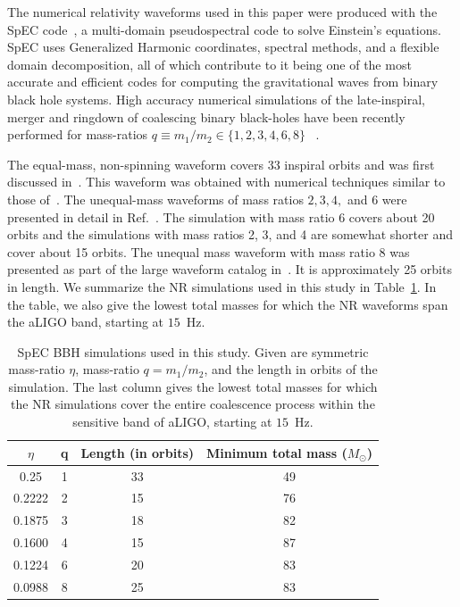 \documentclass[aps,
prd,
twocolumn,
superscriptaddress,
lengthcheck,showpacs,letterpaper,nofootinbib,
floatfix]{revtex4-1}
\begin{document}
The numerical relativity waveforms used in this paper were produced
with the SpEC code~\cite{spec}, a multi-domain pseudospectral code to solve
Einstein's equations. SpEC uses Generalized Harmonic coordinates,
spectral methods, and a flexible domain decomposition, all of which
contribute to it being one of the most accurate and efficient codes
for computing the gravitational waves from binary black hole
systems. High accuracy numerical simulations of the late-inspiral,
merger and ringdown  of coalescing binary black-holes have been
recently performed for mass-ratios $q\equiv m_1/m_2\in\{1,2,3,4,6,8\}$
~\cite{Buchman:2012dw,Scheel:2008rj,NRPNComparisonBoyleetal,Mroue:2012kv}.

The equal-mass,
non-spinning waveform covers 33 inspiral orbits and was first discussed
in~\cite{MacDonald:2012mp,Mroue:2012kv}. 
This waveform was obtained with numerical techniques similar to those 
of~\cite{Buchman:2012dw}. The unequal-mass waveforms of mass ratios 
$2, 3, 4,$ and $6$ were presented in detail in Ref.~\cite{Buchman:2012dw}.
The simulation with mass ratio $6$ covers about 20 orbits and the
simulations with mass ratios 2, 3, and 4 are somewhat shorter and
cover about 15 orbits. The unequal mass waveform with mass ratio 8 was
presented as part of the large waveform catalog
in~\cite{Mroue:2013xna,Mroue:2012kv}. It is approximately 25 orbits in
length. 
We summarize the NR simulations used in this study in 
Table~\ref{table:etalist4}. In the table, we also give the  
lowest total masses for which the NR waveforms span the aLIGO 
band, starting at $15$~Hz.

\begin{table}
\begin{tabular}{| c | c | c | c |}
\hline
$\hspace{10pt}\eta\hspace{10pt}$ & \hspace{15pt} q\hspace{15pt} & Length (in orbits) & Minimum total mass ($M_\odot$)\\ \hline
0.25 & 1 & 33 & 49 \\
0.2222 & 2 & 15 & 76 \\
0.1875 & 3 & 18 & 82 \\
0.1600 & 4 & 15 & 87 \\
0.1224 & 6 & 20 & 83 \\
0.0988 & 8 & 25 & 83 \\
\hline
\end{tabular}
\caption{SpEC BBH simulations used in this study.  Given are symmetric mass-ratio $\eta$, mass-ratio $q=m_1/m_2$, and the length in orbits of the simulation. 
The last column gives the lowest total masses for which the NR simulations 
cover the entire coalescence process within the sensitive band of aLIGO,
starting at $15$~Hz.}
\label{table:etalist4}
\end{table}
\end{document}
